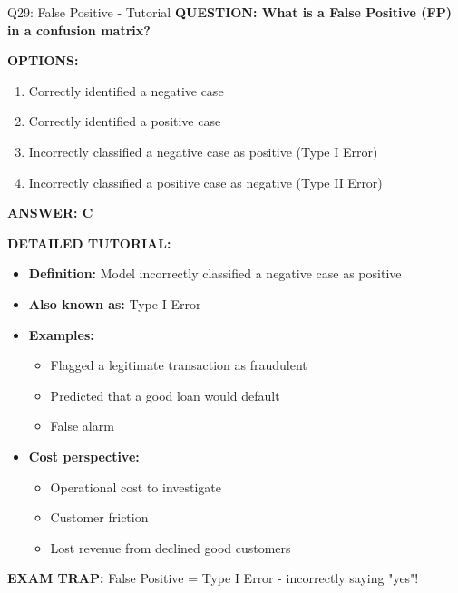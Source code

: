 \documentclass[8pt]{beamer}
\begin{document}
	\begin{frame}{Q29: False Positive - Tutorial}
		\fontsize{6.5}{7.5}\selectfont
		\textbf{QUESTION: What is a False Positive (FP) in a confusion matrix?}
		
		\vspace{0.1cm}
		\textbf{OPTIONS:}
		\begin{enumerate}
			\item Correctly identified a negative case
			\item Correctly identified a positive case
			\item Incorrectly classified a negative case as positive (Type I Error)
			\item Incorrectly classified a positive case as negative (Type II Error)
		\end{enumerate}
		
		\vspace{0.1cm}
		\textcolor{myblue}{\textbf{ANSWER: C}}
		
		\vspace{0.1cm}
		\textbf{DETAILED TUTORIAL:}
		\begin{itemize}
			\item \textbf{Definition:} Model incorrectly classified a negative case as positive
			\item \textbf{Also known as:} Type I Error
			\item \textbf{Examples:}
			\begin{itemize}
				\item Flagged a legitimate transaction as fraudulent
				\item Predicted that a good loan would default
				\item False alarm
			\end{itemize}
			\item \textbf{Cost perspective:}
			\begin{itemize}
				\item Operational cost to investigate
				\item Customer friction
				\item Lost revenue from declined good customers
			\end{itemize}
		\end{itemize}
		
		\textcolor{myred}{\textbf{EXAM TRAP:}} False Positive = \textcolor{myblue}{Type I Error} - incorrectly saying "yes"!
	\end{frame}
	
\end{document}

